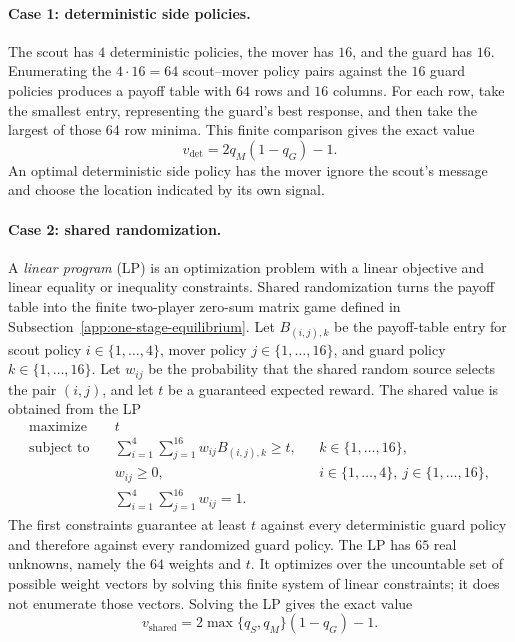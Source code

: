 \paragraph{Case 1: deterministic side policies.}
The scout has $4$ deterministic policies, the mover has $16$, and the guard has $16$. Enumerating the $4\cdot16=64$ scout--mover policy pairs against the $16$ guard policies produces a payoff table with $64$ rows and $16$ columns. For each row, take the smallest entry, representing the guard's best response, and then take the largest of those $64$ row minima. This finite comparison gives the exact value
\[
    v_{\mathrm{det}}
    =
    2q_M(1-q_G)-1.
\]
An optimal deterministic side policy has the mover ignore the scout's message and choose the location indicated by its own signal.

\paragraph{Case 2: shared randomization.}
A \emph{linear program} (LP) is an optimization problem with a linear objective and linear equality or inequality constraints. Shared randomization turns the payoff table into the finite two-player zero-sum matrix game defined in Subsection~\ref{app:one-stage-equilibrium}. Let $B_{(i,j),k}$ be the payoff-table entry for scout policy $i\in\{1,\ldots,4\}$, mover policy $j\in\{1,\ldots,16\}$, and guard policy $k\in\{1,\ldots,16\}$. Let $w_{ij}$ be the probability that the shared random source selects the pair $(i,j)$, and let $t$ be a guaranteed expected reward. The shared value is obtained from the LP
\[
    \begin{aligned}
    \text{maximize}\quad & t \\
    \text{subject to}\quad
    & \sum_{i=1}^{4}\sum_{j=1}^{16}
      w_{ij}B_{(i,j),k}\geq t,
      && k\in\{1,\ldots,16\}, \\
    & w_{ij}\geq0,
      && i\in\{1,\ldots,4\},\ j\in\{1,\ldots,16\}, \\
    & \sum_{i=1}^{4}\sum_{j=1}^{16}w_{ij}=1.
    \end{aligned}
\]
The first constraints guarantee at least $t$ against every deterministic guard policy and therefore against every randomized guard policy. The LP has $65$ real unknowns, namely the $64$ weights and $t$. It optimizes over the uncountable set of possible weight vectors by solving this finite system of linear constraints; it does not enumerate those vectors. Solving the LP gives the exact value
\[
    v_{\mathrm{shared}}
    =
    2\max\{q_S,q_M\}(1-q_G)-1.
\]
